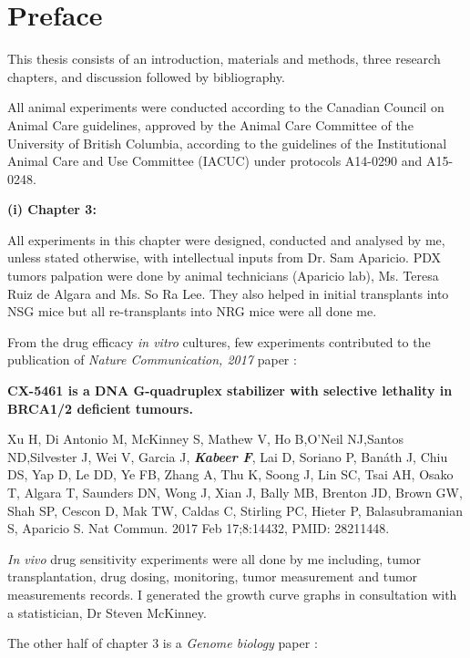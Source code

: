 
\chapter{Preface}
This thesis consists of an introduction, materials and methods, three research chapters, and discussion followed by bibliography.

All animal experiments were conducted according to the Canadian Council on Animal Care guidelines, approved by the Animal Care Committee of the University of British Columbia, according to the guidelines of the Institutional Animal Care and Use Committee (IACUC) under protocols A14-0290 and A15-0248.
  
  \textbf{(i) Chapter 3:}

All experiments in this chapter were designed, conducted and analysed by me, unless stated otherwise, with intellectual inputs from Dr. Sam Aparicio. PDX tumors palpation were done by animal technicians (Aparicio lab), Ms. Teresa Ruiz de Algara and Ms. So Ra Lee. They also helped in initial transplants into \ac{NSG} mice but all re-transplants into \ac{NRG} mice were all done me. 


From the drug efficacy \textit{in vitro} cultures, few experiments contributed to the publication of \textit{Nature Communication, 2017} paper \cite{xu2017cx}:

\textbf{CX-5461 is a DNA G-quadruplex stabilizer with selective lethality in BRCA1/2 deficient tumours.}

Xu H, Di Antonio M, McKinney S, Mathew V, Ho B,O'Neil NJ,Santos ND,Silvester J, Wei V, Garcia J, \emph{\textbf{Kabeer F}}, Lai D, Soriano P, Banáth J, Chiu DS, Yap D, Le DD, Ye FB, Zhang A, Thu K, Soong J, Lin SC, Tsai AH, Osako T, Algara T, Saunders DN, Wong J, Xian J, Bally MB, Brenton JD, Brown GW, Shah SP, Cescon D, Mak TW, Caldas C, Stirling PC, Hieter P, Balasubramanian S, Aparicio S. Nat Commun. 2017 Feb 17;8:14432, PMID: 28211448.



 \textit{In vivo} drug sensitivity experiments were all done by me including, tumor transplantation, drug dosing, monitoring, tumor measurement and tumor measurements records. I generated the growth curve graphs in consultation with a statistician, Dr Steven McKinney.


The other half of chapter 3 is a \textit{Genome biology} paper \cite{o2019dissociation}:


